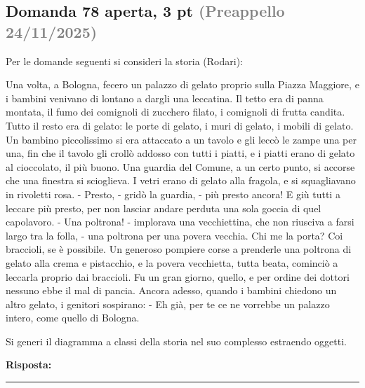 \documentclass[a4paper,11pt]{article}
\begin{document}
\subsection*{Domanda 78 \hfill {\small aperta, 3 pt \textcolor{gray}{(Preappello 24/11/2025)}}}
\begin{tcolorbox}[colback=gray!8,colframe=gray!50,title=Contesto]
Per le domande seguenti si consideri la storia (Rodari):

Una volta, a Bologna, fecero un palazzo di gelato proprio sulla Piazza Maggiore, e i bambini venivano di lontano a dargli una leccatina. Il tetto era di panna montata, il fumo dei comignoli di zucchero filato, i comignoli di frutta candita. Tutto il resto era di gelato: le porte di gelato, i muri di gelato, i mobili di gelato. Un bambino piccolissimo si era attaccato a un tavolo e gli leccò le zampe una per una, fin che il tavolo gli crollò addosso con tutti i piatti, e i piatti erano di gelato al cioccolato, il più buono. Una guardia del Comune, a un certo punto, si accorse che una finestra si scioglieva. I vetri erano di gelato alla fragola, e si squagliavano in rivoletti rosa. - Presto, - gridò la guardia, - più presto ancora! E giù tutti a leccare più presto, per non lasciar andare perduta una sola goccia di quel capolavoro. - Una poltrona! - implorava una vecchiettina, che non riusciva a farsi largo tra la folla, - una poltrona per una povera vecchia. Chi me la porta? Coi braccioli, se è possibile. Un generoso pompiere corse a prenderle una poltrona di gelato alla crema e pistacchio, e la povera vecchietta, tutta beata, cominciò a leccarla proprio dai braccioli. Fu un gran giorno, quello, e per ordine dei dottori nessuno ebbe il mal di pancia. Ancora adesso, quando i bambini chiedono un altro gelato, i genitori sospirano: - Eh già, per te ce ne vorrebbe un palazzo intero, come quello di Bologna.
\end{tcolorbox}
Si generi il diagramma a classi della storia nel suo complesso estraendo oggetti.

\vspace{0.2cm}
\noindent\textbf{Risposta:}\par
\vspace{4cm}\hrule


\end{document}
